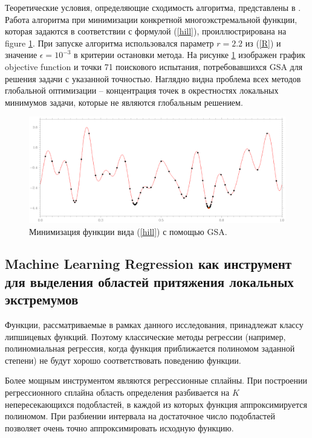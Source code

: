 \documentclass[entropy,article,submit,moreauthors,pdftex]{Definitions/mdpi}
\begin{document}
Теоретические условия, определяющие сходимость алгоритма, представлены в \cite{Strongin2000}. 
Работа алгоритма при минимизации конкретной многоэкстремальной функции, которая задаются в соответствии с формулой (\ref{hill}), проиллюстрирована на figure \ref{fig1}. При запуске алгоритма использовался параметр $r=2.2$ из (\ref{R}) и значение $\epsilon = 10^{-3}$ в критерии остановки метода.
На рисунке \ref{fig1} изображен график objective function и точки 71 поискового испытания, потребовавшихся GSA для решения задачи с указанной точностью. Наглядно видна проблема всех методов глобальной оптимизации -- концентрация точек в окрестностях локальных минимумов задачи, которые не являются глобальным решением. 

\begin{figure}[H]
\includegraphics[width=1.0\linewidth]{HillAGP90.png}
\caption{Минимизация функции вида (\ref{hill}) с помощью GSA.}
\label{fig1}
\end{figure}   


\subsection{Machine Learning Regression как инструмент для выделения областей притяжения локальных экстремумов}\label{TreeGSA}

Функции, рассматриваемые в рамках данного исследования, принадлежат классу липшицевых функций. Поэтому классические методы регрессии (например, полиномиальная регрессия, когда функция приближается полиномом заданной степени) не будут хорошо соответствовать поведению функции. 

Более мощным инструментом являются регрессионные сплайны. При построении регрессионного сплайна область определения разбивается на $K$ непересекающихся подобластей, в каждой из которых функция аппроксимируется полиномом. При разбиении интервала на достаточное число подобластей позволяет очень точно аппроксимировать исходную функцию. 
\end{document}
